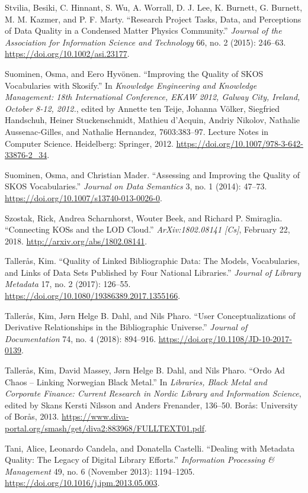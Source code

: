 Stvilia, Besiki, C. Hinnant, S. Wu, A. Worrall, D. J. Lee, K. Burnett, G. Burnett, M. M. Kazmer, and P. F. Marty. “Research Project Tasks, Data, and Perceptions of Data Quality in a Condensed Matter Physics Community.” \emph{Journal of the Association for Information Science and Technology} 66, no. 2 (2015): 246–63. \url{https://doi.org/10.1002/asi.23177}.

Suominen, Osma, and Eero Hyvönen. “Improving the Quality of SKOS Vocabularies with Skosify.” In \emph{Knowledge Engineering and Knowledge Management: 18th International Conference, EKAW 2012, Galway City, Ireland, October 8-12, 2012.}, edited by Annette ten Teije, Johanna Völker, Siegfried Handschuh, Heiner Stuckenschmidt, Mathieu d’Acquin, Andriy Nikolov, Nathalie Aussenac-Gilles, and Nathalie Hernandez, 7603:383–97. Lecture Notes in Computer Science. Heidelberg: Springer, 2012. \url{https://doi.org/10.1007/978-3-642-33876-2_34}.

Suominen, Osma, and Christian Mader. “Assessing and Improving the Quality of SKOS Vocabularies.” \emph{Journal on Data Semantics} 3, no. 1 (2014): 47–73. \url{https://doi.org/10.1007/s13740-013-0026-0}.

Szostak, Rick, Andrea Scharnhorst, Wouter Beek, and Richard P. Smiraglia. “Connecting KOSs and the LOD Cloud.” \emph{ArXiv:1802.08141 [Cs]}, February 22, 2018. \url{http://arxiv.org/abs/1802.08141}.

Tallerås, Kim. “Quality of Linked Bibliographic Data: The Models, Vocabularies, and Links of Data Sets Published by Four National Libraries.” \emph{Journal of Library Metadata} 17, no. 2 (2017): 126–55. \url{https://doi.org/10.1080/19386389.2017.1355166}.

Tallerås, Kim, Jørn Helge B. Dahl, and Nils Pharo. “User Conceptualizations of Derivative Relationships in the Bibliographic Universe.” \emph{Journal of Documentation} 74, no. 4 (2018): 894–916. \url{https://doi.org/10.1108/JD-10-2017-0139}.

Tallerås, Kim, David Massey, Jørn Helge B. Dahl, and Nils Pharo. “Ordo Ad Chaos – Linking Norwegian Black Metal.” In \emph{Libraries, Black Metal and Corporate Finance: Current Research in Nordic Library and Information Science}, edited by Skans Kersti Nilsson and Anders Frenander, 136–50. Borås: University of Borås, 2013. \url{https://www.diva-portal.org/smash/get/diva2:883968/FULLTEXT01.pdf}.

Tani, Alice, Leonardo Candela, and Donatella Castelli. “Dealing with Metadata Quality: The Legacy of Digital Library Efforts.” \emph{Information Processing \& Management} 49, no. 6 (November 2013): 1194–1205. \url{https://doi.org/10.1016/j.ipm.2013.05.003}.

